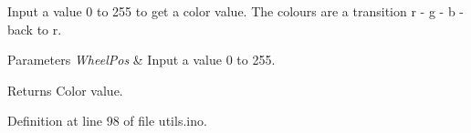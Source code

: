 Input a value 0 to 255 to get a color value. The colours are a transition r -\/ g -\/ b -\/ back to r. 


\begin{DoxyParams}{Parameters}
{\em Wheel\+Pos} & Input a value 0 to 255. \\
\hline
\end{DoxyParams}
\begin{DoxyReturn}{Returns}
Color value. 
\end{DoxyReturn}


Definition at line 98 of file utils.\+ino.

